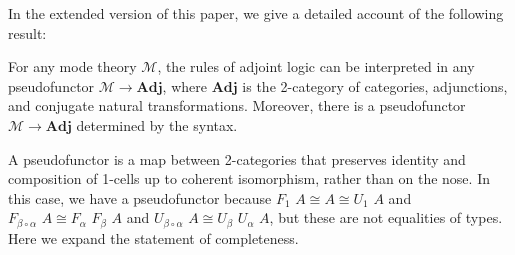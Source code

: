 \documentclass{drl-common/llncs}
\newcommand{\M}{\ensuremath{\mathcal{M}}}
\newcommand{\la}{\ensuremath{\dashv}}
\newcommand{\Adj}{\textbf{Adj}}
\newcommand\compo[2]{\ensuremath{#1 \circ #2}}
\renewcommand\wftp[2]{\ensuremath{#1 \,\,\, \dsd{type}_{#2}}}
\newcommand\F[2]{\ensuremath{F_{#1} \,\, #2}}
\newcommand\U[2]{\ensuremath{U_{#1} \,\, #2}}
\newcommand\seq[3]{\ensuremath{#1 \, [ #2 ] \, \vdash \, #3}}
\newcommand\ident[1]{\ensuremath{\dsd{ident}_{#1}}}
\newcommand\cutsym{\ensuremath{\dsd{cut}}}
\newcommand\cut[2]{\ensuremath{{\cutsym \,\, #1 \,\, #2}}}
\newcommand\cuti{\ensuremath{\bullet}}
\newcommand\ap[2]{\ensuremath{#1 \approx #2}}
\newcommand\iso{\cong}
\newcommand\ltor[2]{\ensuremath{{#1^{\vartriangleright_{#2}}}}}
\newcommand\rtol[2]{\ensuremath{{#1^{\vartriangleleft_{#2}}}}}
\begin{document}
In the extended version of this paper, we give a detailed account of the
following result:

\begin{theorem}
For any mode theory \M, the rules of adjoint logic can be interpreted in
any pseudofunctor $\M \to \Adj$, where $\Adj$ is the 2-category of
categories, adjunctions, and conjugate natural transformations.
Moreover, there is a pseudofunctor $\M \to \Adj$ determined by the
syntax.
\end{theorem}
A pseudofunctor is a map between 2-categories that preserves identity
and composition of 1-cells up to coherent isomorphism, rather than on
the nose. In this case, we have a pseudofunctor because $\F 1 A \iso A
\iso \U 1 A$ and $\F{\compo{\beta}{\alpha}}{A} \iso
\F{\alpha}{\F{\beta}{A}}$ and $\U{\compo{\beta}{\alpha}}{A} \iso
\U{\beta}{\U{\alpha}{A}}$, but these are not equalities of types.  Here
we expand the statement of completeness.




\end{document}
